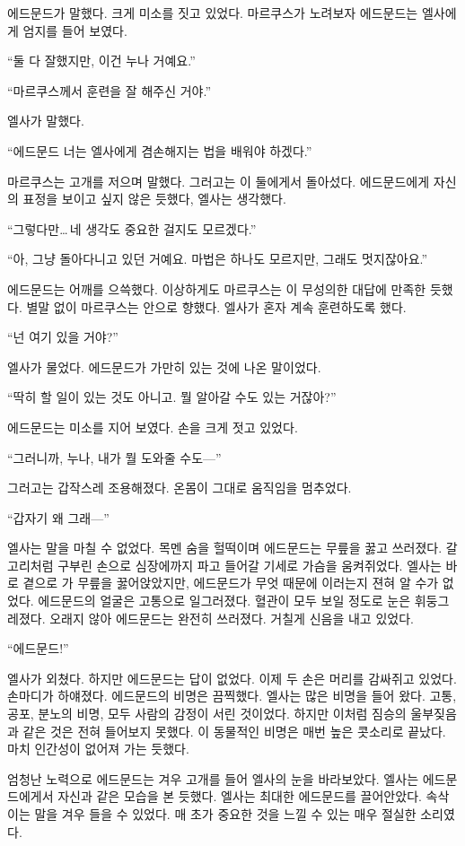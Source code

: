에드문드가 말했다. 크게 미소를 짓고 있었다. 마르쿠스가 노려보자 에드문드는 엘사에게 엄지를 들어 보였다.

``둘 다 잘했지만, 이건 누나 거예요.''

``마르쿠스께서 훈련을 잘 해주신 거야.''

엘사가 말했다.

``에드문드 너는 엘사에게 겸손해지는 법을 배워야 하겠다.''

마르쿠스는 고개를 저으며 말했다. 그러고는 이 둘에게서 돌아섰다. 에드문드에게 자신의 표정을 보이고 싶지 않은 듯했다, 엘사는 생각했다.

``그렇다만\ldots\,네 생각도 중요한 걸지도 모르겠다.''

``아, 그냥 돌아다니고 있던 거예요. 마법은 하나도 모르지만, 그래도 멋지잖아요.''

에드문드는 어깨를 으쓱했다. 이상하게도 마르쿠스는 이 무성의한 대답에 만족한 듯했다. 별말 없이 마르쿠스는 안으로 향했다. 엘사가 혼자 계속 훈련하도록 했다.

``넌 여기 있을 거야?''

엘사가 물었다. 에드문드가 가만히 있는 것에 나온 말이었다.

``딱히 할 일이 있는 것도 아니고. 뭘 알아갈 수도 있는 거잖아?''

에드문드는 미소를 지어 보였다. 손을 크게 젓고 있었다.

``그러니까, 누나, 내가 뭘 도와줄 수도—''

그러고는 갑작스레 조용해졌다. 온몸이 그대로 움직임을 멈추었다.

``갑자기 왜 그래—''

엘사는 말을 마칠 수 없었다. 목멘 숨을 헐떡이며 에드문드는 무릎을 꿇고 쓰러졌다. 갈고리처럼 구부린 손으로 심장에까지 파고 들어갈 기세로 가슴을 움켜쥐었다. 엘사는 바로 곁으로 가 무릎을 꿇어앉았지만, 에드문드가 무엇 때문에 이러는지 젼혀 알 수가 없었다. 에드문드의 얼굴은 고통으로 일그러졌다. 혈관이 모두 보일 정도로 눈은 휘둥그레졌다. 오래지 않아 에드문드는 완전히 쓰러졌다. 거칠게 신음을 내고 있었다.

``에드문드!''

엘사가 외쳤다. 하지만 에드문드는 답이 없었다. 이제 두 손은 머리를 감싸쥐고 있었다. 손마디가 하얘졌다. 에드문드의 비명은 끔찍했다. 엘사는 많은 비명을 들어 왔다. 고통, 공포, 분노의 비명, 모두 사람의 감정이 서린 것이었다. 하지만 이처럼 짐승의 울부짖음과 같은 것은 전혀 들어보지 못했다. 이 동물적인 비명은 매번 높은 콧소리로 끝났다. 마치 인간성이 없어져 가는 듯했다.

엄청난 노력으로 에드문드는 겨우 고개를 들어 엘사의 눈을 바라보았다. 엘사는 에드문드에게서 자신과 같은 모습을 본 듯했다. 엘사는 최대한 에드문드를 끌어안았다. 속삭이는 말을 겨우 들을 수 있었다. 매 초가 중요한 것을 느낄 수 있는 매우 절실한 소리였다.


